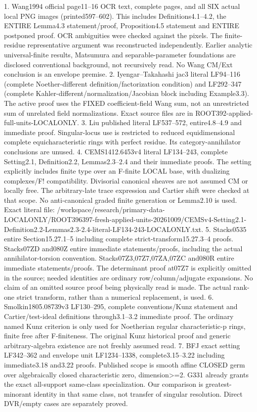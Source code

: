\documentclass[11pt]{article}
\begin{document}
1. Wang1994 official page11--16 OCR text, complete pages, and all SIX actual local PNG images (printed597--602). This includes Definitions4.1--4.2, the ENTIRE Lemma4.3 statement/proof, Proposition4.5 statement and ENTIRE postponed proof. OCR ambiguities were checked against the pixels. The finite-residue representative argument was reconstructed independently. Earlier analytic universal-finite results, Matsumura and separable-parameter foundations are disclosed conventional background, not recursively read. No Wang CM/Ext conclusion is an envelope premise.
2. Iyengar--Takahashi jac3 literal LF94--116 (complete Noether-different definition/factorization condition) and LF292--347 (complete Kahler-different/normalization/Jacobian block including Example3.3). The active proof uses the FIXED coefficient-field Wang sum, not an unrestricted sum of unrelated field normalizations. Exact source files are in ROOT392-applied-full-units-LOCALONLY.
3. Liu published literal LF537--572, entire4.8--4.9 and immediate proof. Singular-locus use is restricted to reduced equidimensional complete equicharacteristic rings with perfect residue. Its category-annihilator conclusions are unused.
4. CEMS1412.6453v4 literal LF134--243, complete Setting2.1, Definition2.2, Lemmas2.3--2.4 and their immediate proofs. The setting explicitly includes finite type over an F-finite LOCAL base, with dualizing complexes/F! compatibility. Divisorial canonical sheaves are not assumed CM or locally free. The arbitrary-late trace expression and Cartier shift were checked at that scope. No anti-canonical graded finite generation or Lemma2.10 is used. Exact literal file: /workspace/research/primary-data-LOCALONLY/ROOT396397-fresh-applied-units-20261009/CEMSv4-Setting2.1-Definition2.2-Lemmas2.3-2.4-literal-LF134-243-LOCALONLY.txt.
5. Stacks0535 entire Section15.27.1--5 including complete strict-transform15.27.3--4 proofs. Stacks07ZD and080Z entire immediate statements/proofs, including the actual annihilator-torsion convention. Stacks07Z3,07Z7,07ZA,07ZC and080R entire immediate statements/proofs. The determinant proof at07Z7 is explicitly omitted in the source; needed identities are ordinary row/column/adjugate expansions. No claim of an omitted source proof being physically read is made. The actual rank-one strict transform, rather than a numerical replacement, is used.
6. Smolkin1805.08739v3 LF130--295, complete conventions/Kunz statement and Cartier/test-ideal definitions through3.1--3.2 immediate proof. The ordinary named Kunz criterion is only used for Noetherian regular characteristic-p rings, finite free after F-finiteness. The original Kunz historical proof and generic arbitrary-algebra existence are not freshly assumed read.
7. BFJ exact setting LF342--362 and envelope unit LF1234--1338, complete3.15--3.22 including immediate3.18 and3.22 proofs. Published scope is smooth affine CLOSED germ over algebraically closed characteristic zero, dimension>=2. G331 already grants the exact all-support same-class specialization. Our comparison is greatest-minorant identity in that same class, not transfer of singular resolution. Direct DVR/empty cases are separately proved.
\end{document}
